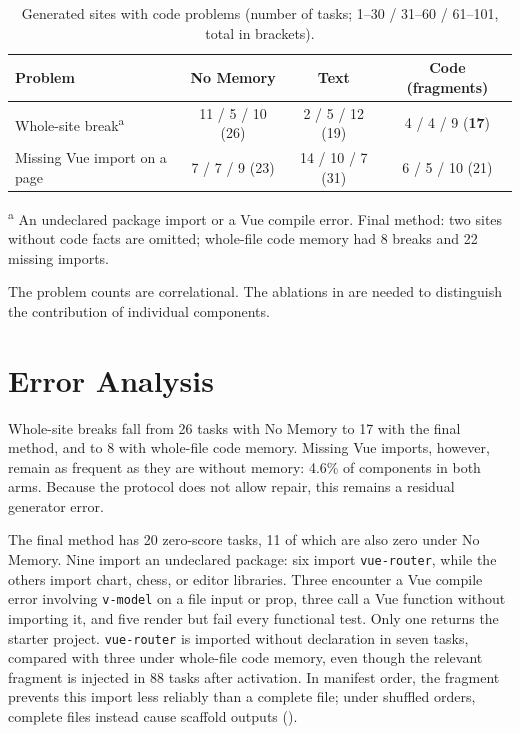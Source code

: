 \begin{table}[ht]
\centering
\small
\caption{Generated sites with code problems (number of tasks; 1--30 / 31--60 / 61--101, total in brackets).}
\label{tab:codeerr}
\begin{tabular}{lccc}
\toprule
Problem & No Memory & Text & Code (fragments) \\
\midrule
Whole-site break\textsuperscript{a} & 11 / 5 / 10 (26) & 2 / 5 / 12 (19) & 4 / 4 / 9 (\textbf{17}) \\
Missing Vue import on a page & 7 / 7 / 9 (23) & 14 / 10 / 7 (31) & 6 / 5 / 10 (21) \\
\bottomrule
\end{tabular}

\smallskip\parbox{\linewidth}{\footnotesize \textsuperscript{a} An undeclared package import or a Vue compile error. Final method: two sites without code facts are omitted; whole-file code memory had 8 breaks and 22 missing imports.}
\end{table}

The problem counts are correlational. The ablations in  are needed to distinguish the contribution of individual components.

\section{Error Analysis}
Whole-site breaks fall from 26 tasks with No Memory to 17 with the final method, and to 8 with whole-file code memory. Missing Vue imports, however, remain as frequent as they are without memory: 4.6\% of components in both arms. Because the protocol does not allow repair, this remains a residual generator error.

The final method has 20 zero-score tasks, 11 of which are also zero under No Memory. Nine import an undeclared package: six import \texttt{vue-router}, while the others import chart, chess, or editor libraries. Three encounter a Vue compile error involving \texttt{v-model} on a file input or prop, three call a Vue function without importing it, and five render but fail every functional test. Only one returns the starter project. \texttt{vue-router} is imported without declaration in seven tasks, compared with three under whole-file code memory, even though the relevant fragment is injected in 88 tasks after activation. In manifest order, the fragment prevents this import less reliably than a complete file; under shuffled orders, complete files instead cause scaffold outputs ().


